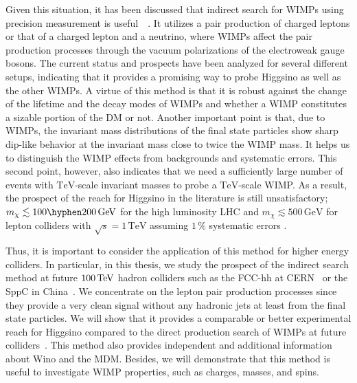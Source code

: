 \documentclass[12pt,twoside,book]{article}
\begin{document}
Given this situation, it has been discussed that indirect search for WIMPs using precision measurement is useful~~\cite{Alves:2014cda, Gross:2016ioi, Farina:2016rws,Harigaya:2015yaa, Matsumoto:2017vfu, DiLuzio:2018jwd, Matsumoto:2018ioi}.
It utilizes a pair production of charged leptons or that of a charged lepton and a neutrino, where WIMPs affect the pair production processes through the vacuum polarizations of the electroweak gauge bosons.
The current status and prospects have been analyzed for several different setups, indicating that it provides a promising way to probe Higgsino as well as the other WIMPs.
A virtue of this method is that it is robust against the change of the lifetime and the decay modes of WIMPs and whether a WIMP constitutes a sizable portion of the DM or not.
Another important point is that, due to WIMPs, the invariant mass distributions of the final state particles show sharp dip-like behavior at the invariant mass close to twice the WIMP mass.
It helps us to distinguish the WIMP effects from backgrounds and systematic errors.
This second point, however, also indicates that we need a sufficiently large number of events with $\mathrm{TeV}$-scale invariant masses to probe a $\mathrm{TeV}$-scale WIMP.
As a result, the prospect of the reach for Higgsino in the literature is still unsatisfactory; $m_\chi \lesssim 100 \hyphen 200\,\mathrm{GeV}$ for the high luminosity LHC \cite{Matsumoto:2017vfu,  Matsumoto:2018ioi} and $m_\chi \lesssim 500\,\mathrm{GeV}$ for lepton colliders with $\sqrt{s}=1\,\mathrm{TeV}$ assuming $1\,\%$ systematic errors \cite{Harigaya:2015yaa}.

Thus, it is important to consider the application of this method for higher energy colliders.
In particular, in this thesis, we study the prospect of the indirect search method at future $100\,{\rm TeV}$ hadron colliders such as the FCC-hh at CERN~\cite{Mangano:2016jyj, Contino:2016spe, Golling:2016gvc} or the SppC in China~\cite{CEPC-SPPCStudyGroup:2015csa, CEPC-SPPCStudyGroup:2015esa}.
We concentrate on the lepton pair production processes since they provide a very clean signal without any hadronic jets at least from the final state particles.
We will show that it provides a comparable or better experimental reach for Higgsino compared to the direct production search of WIMPs at future colliders~\cite{Low:2014cba, Cirelli:2014dsa, Han:2018wus, Mahbubani:2017gjh}.
This method also provides independent and additional information about Wino and the MDM.
Besides, we will demonstrate that this method is useful to investigate WIMP properties, such as charges, masses, and spins.
\end{document}
